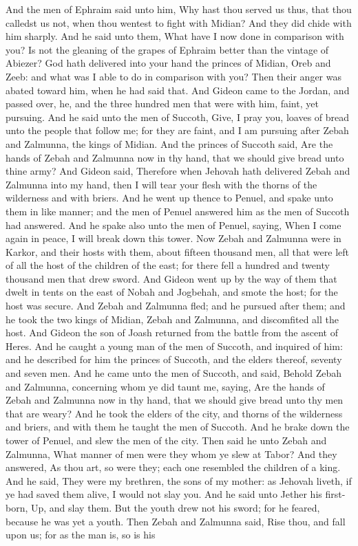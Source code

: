 And the men of Ephraim said unto him, Why hast thou served us thus, that thou calledst us not, when thou wentest to fight with Midian? And they did chide with him sharply. And he said unto them, What have I now done in comparison with you? Is not the gleaning of the grapes of Ephraim better than the vintage of Abiezer? God hath delivered into your hand the princes of Midian, Oreb and Zeeb: and what was I able to do in comparison with you? Then their anger was abated toward him, when he had said that.  And Gideon came to the Jordan, and passed over, he, and the three hundred men that were with him, faint, yet pursuing. And he said unto the men of Succoth, Give, I pray you, loaves of bread unto the people that follow me; for they are faint, and I am pursuing after Zebah and Zalmunna, the kings of Midian. And the princes of Succoth said, Are the hands of Zebah and Zalmunna now in thy hand, that we should give bread unto thine army? And Gideon said, Therefore when Jehovah hath delivered Zebah and Zalmunna into my hand, then I will tear your flesh with the thorns of the wilderness and with briers. And he went up thence to Penuel, and spake unto them in like manner; and the men of Penuel answered him as the men of Succoth had answered. And he spake also unto the men of Penuel, saying, When I come again in peace, I will break down this tower.  Now Zebah and Zalmunna were in Karkor, and their hosts with them, about fifteen thousand men, all that were left of all the host of the children of the east; for there fell a hundred and twenty thousand men that drew sword. And Gideon went up by the way of them that dwelt in tents on the east of Nobah and Jogbehah, and smote the host; for the host was secure. And Zebah and Zalmunna fled; and he pursued after them; and he took the two kings of Midian, Zebah and Zalmunna, and discomfited all the host.  And Gideon the son of Joash returned from the battle from the ascent of Heres. And he caught a young man of the men of Succoth, and inquired of him: and he described for him the princes of Succoth, and the elders thereof, seventy and seven men. And he came unto the men of Succoth, and said, Behold Zebah and Zalmunna, concerning whom ye did taunt me, saying, Are the hands of Zebah and Zalmunna now in thy hand, that we should give bread unto thy men that are weary? And he took the elders of the city, and thorns of the wilderness and briers, and with them he taught the men of Succoth. And he brake down the tower of Penuel, and slew the men of the city.  Then said he unto Zebah and Zalmunna, What manner of men were they whom ye slew at Tabor? And they answered, As thou art, so were they; each one resembled the children of a king. And he said, They were my brethren, the sons of my mother: as Jehovah liveth, if ye had saved them alive, I would not slay you. And he said unto Jether his first-born, Up, and slay them. But the youth drew not his sword; for he feared, because he was yet a youth. Then Zebah and Zalmunna said, Rise thou, and fall upon us; for as the man is, so is his 